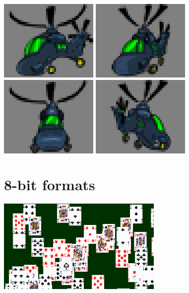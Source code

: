 \documentclass[10pt]{book}
\begin{document}
\begin{center}
\includegraphics[width=135pt]{previews/nightstrike_1-COPTER_FALL-00.png}
\includegraphics[width=135pt]{previews/nightstrike_1-COPTER_FALL-01.png}
\includegraphics[width=135pt]{previews/nightstrike_1-COPTER_FALL-02.png}
\includegraphics[width=135pt]{previews/nightstrike_1-COPTER_FALL-03.png}
\end{center}

\newpage
\section{8-bit formats}
\label{eightbit}

\begin{center}
\includegraphics[width=0.6\textwidth]{assets/0034.png}
\end{center}
\end{document}
